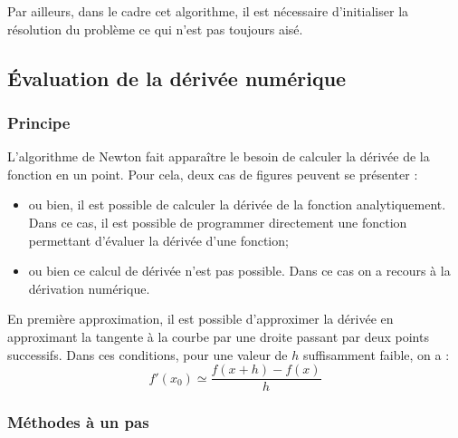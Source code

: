 \documentclass[10pt]{article}
\begin{document}
Par ailleurs, dans le cadre cet algorithme, il est nécessaire d'initialiser la résolution du problème ce qui n'est pas toujours aisé.

\subsection{Évaluation de la dérivée numérique}
\subsubsection{Principe}
L'algorithme de Newton fait apparaître le besoin de calculer la dérivée de la fonction en un point. Pour cela, deux cas de figures peuvent se présenter : 
\begin{itemize}
\item ou bien, il est possible de calculer la dérivée de la fonction analytiquement. Dans ce cas, il est possible de programmer directement une fonction permettant d'évaluer la dérivée d'une fonction;
\item ou bien ce calcul de dérivée n'est pas possible. Dans ce cas on a recours à la dérivation numérique.
\end{itemize}

\begin{resultat}
En première approximation, il est possible d'approximer la dérivée en approximant la tangente à la courbe par une droite passant par deux points successifs. Dans ces conditions, pour une valeur de $h$ suffisamment faible, on a : 
$$
f'(x_0)\simeq \dfrac{f(x+h)-f(x)}{h}	
$$
\end{resultat}


%

\subsubsection{Méthodes à un pas}
\end{document}
